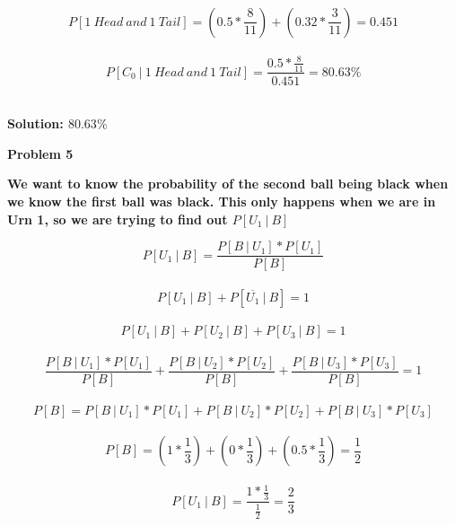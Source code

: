 \documentclass[11pt]{article}
\begin{document}
\begin{enumerate}
\begin{itemize}
\\
$$P[1\ Head\ and\ 1\ Tail] = (0.5 * \frac{8}{11}) + (0.32 * \frac{3}{11}) = 0.451$$
\\
$$P[C_0\ |\ 1\ Head\ and\ 1\ Tail] = \frac{0.5 * \frac{8}{11}}{0.451} = 80.63\%$$
\\
\begin{center}
\textbf{Solution: $80.63\%$}
\end{center}
\end{itemize}
\newpage
\textbf{Problem 5}
\\
\begin{center}
\textbf{We want to know the probability of the second ball being black when we know the first ball was black.  This only happens when we are in Urn 1, so we are trying to find out $P[U_1\ |\ B]$}
\end{center}
$$ P[U_1\ |\ B] = \frac{P[B\ |\ U_1] * P[U_1]}{P[B]}$$
\\
$$P[U_1\ |\ B] + P[\overline{U_1}\ |\ B] = 1$$
\\
$$P[U_1\ |\ B] + P[U_2\ |\ B] + P[U_3\ |\ B] = 1$$
\\
$$\frac{P[B\ |\ U_1] * P[U_1]}{P[B]} + \frac{P[B\ |\ U_2] * P[U_2]}{P[B]} + \frac{P[B\ |\ U_3] * P[U_3]}{P[B]} = 1$$
\\
$$P[B] = P[B\ |\ U_1] * P[U_1] + P[B\ |\ U_2] * P[U_2] + P[B\ |\ U_3] * P[U_3]$$
\\
$$P[B] = (1 * \frac{1}{3}) + (0 * \frac{1}{3}) + (0.5 * \frac{1}{3}) = \frac{1}{2}$$
\\
$$ P[U_1\ |\ B] = \frac{1 * \frac{1}{3}}{\frac{1}{2}} = \frac{2}{3}$$
\end{enumerate}
\end{document}
